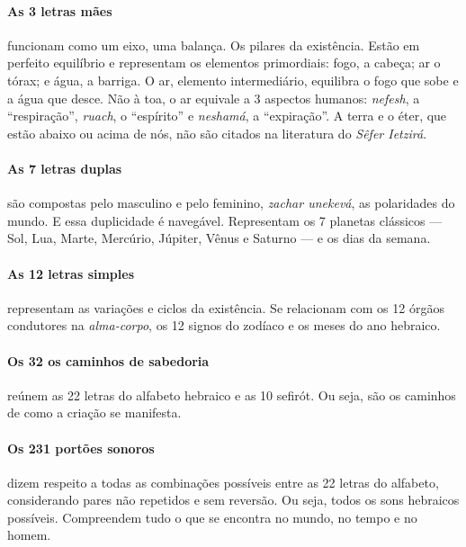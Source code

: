 \paragraph{As 3 letras mães} funcionam como um eixo, uma balança. Os pilares da existência. Estão em perfeito equilíbrio e representam os elementos primordiais: fogo, a cabeça; ar o tórax; e água, a barriga. O ar, elemento intermediário, equilibra o fogo que sobe e a água que desce. Não à toa, o ar equivale a 3 aspectos humanos: \textit{nefesh}, a ``respiração'', \textit{ruach}, o ``espírito'' e \textit{neshamá}, a ``expiração''. A terra e o éter, que estão abaixo ou acima de nós, não são citados na literatura do \textit{Sêfer Ietzirá}.

\paragraph{As 7 letras duplas} são compostas pelo masculino e pelo feminino, \textit{zachar unekevá}, as polaridades do mundo. E essa duplicidade é navegável. Representam os 7 planetas clássicos --- Sol, Lua, Marte, Mercúrio, Júpiter, Vênus e Saturno --- e os dias da semana.

\paragraph{As 12 letras simples} representam as variações e ciclos da existência. Se relacionam com os 12 órgãos condutores na \textit{alma-corpo}, os 12 signos do zodíaco e os meses do ano hebraico.

\paragraph{Os 32 os caminhos de sabedoria} reúnem as 22 letras do alfabeto hebraico e as 10 sefirót. Ou seja, são os caminhos de como a criação se manifesta.

\paragraph{Os 231 portões sonoros} dizem respeito a todas as combinações possíveis entre as 22 letras do alfabeto, considerando pares não repetidos e sem reversão. Ou seja, todos os sons hebraicos possíveis. Compreendem tudo o que se encontra no mundo, no tempo e no homem.

\pagebreak


